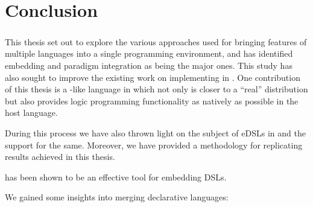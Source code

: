 \documentclass[thesis-solanki.tex]{subfiles}
\begin{document}
\chapter{Conclusion}\label{chap:conclusion}
\paragraph{}
This thesis set out to explore the various approaches used for bringing features of multiple languages into a single 
programming environment, and has identified embedding and paradigm integration as being the major ones. This study has also sought to improve
the existing work on implementing  in . One contribution of this thesis is a  
-like language in  which not only is closer to a ``real''  distribution but also provides 
logic programming functionality as natively as possible in the host language.

During this process we have also thrown light on the subject of eDSLs in  and the support for the same. Moreover, we
have provided a methodology for replicating results achieved in this thesis.

 has been shown to be an effective tool for embedding DSLs.




We gained some insights into merging declarative languages:

\begin{comment}
	We gained some insights into merging declarative languages:
\begin{enumerate}
\item using \progLang{Haskell}'s lazy nature to calculate results lazily (we get one result and then we hit `;' and then the next and so on).

\item Opening up the language  allows easy domain switching (Term $\leftrightarrow$ FlatTerm) because they are isomorphic.

\item Easy extension (Fix FlatTerm).

\item Easily add quantifiers and logic

\item type system allows for safer programs and earlier detection of errors.

\item Custom control flow with the use of monads

\item encapsulate impure code in a monad
\end{enumerate}

We gained some insights into multi paradigm languages:
\begin{itemize}
	\item
\end{itemize}
\end{comment}
\end{document}
